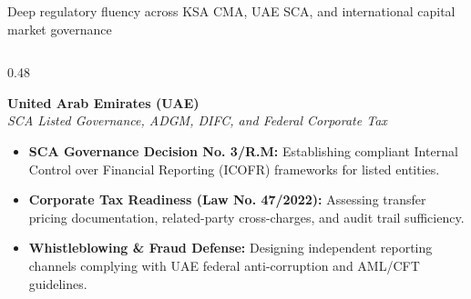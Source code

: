 \documentclass[aspectratio=169, 8pt]{beamer}
\begin{document}
\begin{frame}{Deep regulatory fluency across KSA CMA, UAE SCA, and international capital market governance}
\begin{columns}[T]
        \begin{column}{0.48\textwidth}
            \begin{tcolorbox}[colback=cardBg, colframe=cardBorder, arc=1pt, boxrule=0.5pt, left=4pt, right=4pt, top=3pt, bottom=3pt]
                \textbf{\normalsize \color{terracotta} United Arab Emirates (UAE)} \\
                \textit{\scriptsize \color{textMuted} SCA Listed Governance, ADGM, DIFC, and Federal Corporate Tax}
            \end{tcolorbox}
            \vspace{0.1cm}
            \begin{itemize}
                \setlength{\itemsep}{2.5pt}
                \item \textbf{SCA Governance Decision No. 3/R.M:} Establishing compliant Internal Control over Financial Reporting (ICOFR) frameworks for listed entities.
                \item \textbf{Corporate Tax Readiness (Law No. 47/2022):} Assessing transfer pricing documentation, related-party cross-charges, and audit trail sufficiency.
                \item \textbf{Whistleblowing \& Fraud Defense:} Designing independent reporting channels complying with UAE federal anti-corruption and AML/CFT guidelines.
            \end{itemize}
        \end{column}
    \end{columns}
\end{frame}
\end{document}
